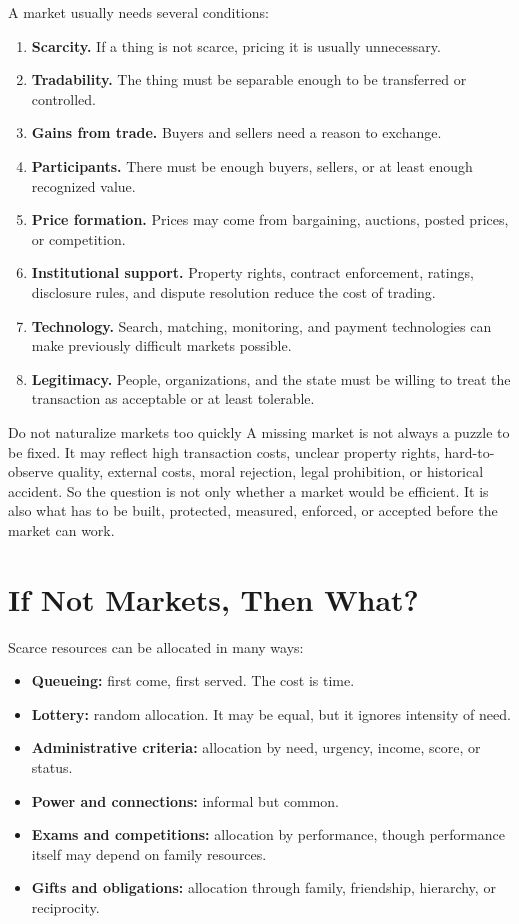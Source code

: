 \documentclass[10pt,a4paper]{article}
\begin{document}
A market usually needs several conditions:

\begin{enumerate}
  \item \textbf{Scarcity.} If a thing is not scarce, pricing it is usually unnecessary.
  \item \textbf{Tradability.} The thing must be separable enough to be transferred or controlled.
  \item \textbf{Gains from trade.} Buyers and sellers need a reason to exchange.
  \item \textbf{Participants.} There must be enough buyers, sellers, or at least enough recognized value.
  \item \textbf{Price formation.} Prices may come from bargaining, auctions, posted prices, or competition.
  \item \textbf{Institutional support.} Property rights, contract enforcement, ratings, disclosure rules, and dispute resolution reduce the cost of trading.
  \item \textbf{Technology.} Search, matching, monitoring, and payment technologies can make previously difficult markets possible.
  \item \textbf{Legitimacy.} People, organizations, and the state must be willing to treat the transaction as acceptable or at least tolerable.
\end{enumerate}

\begin{warningbox}{Do not naturalize markets too quickly}
A missing market is not always a puzzle to be fixed. It may reflect high transaction costs, unclear property rights, hard-to-observe quality, external costs, moral rejection, legal prohibition, or historical accident. So the question is not only whether a market would be efficient. It is also what has to be built, protected, measured, enforced, or accepted before the market can work.
\end{warningbox}

\section{If Not Markets, Then What?}

Scarce resources can be allocated in many ways:

\begin{itemize}
  \item \textbf{Queueing:} first come, first served. The cost is time.
  \item \textbf{Lottery:} random allocation. It may be equal, but it ignores intensity of need.
  \item \textbf{Administrative criteria:} allocation by need, urgency, income, score, or status.
  \item \textbf{Power and connections:} informal but common.
  \item \textbf{Exams and competitions:} allocation by performance, though performance itself may depend on family resources.
  \item \textbf{Gifts and obligations:} allocation through family, friendship, hierarchy, or reciprocity.
\end{itemize}
\end{document}

